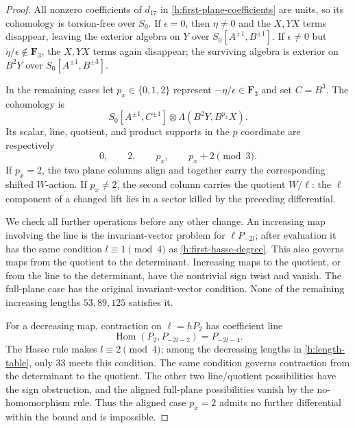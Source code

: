 \documentclass[11pt]{article}
\theoremstyle{definition}
\theoremstyle{remark}
\numberwithin{equation}{section}
\begin{document}
\begin{proof}
All nonzero coefficients of $d_{17}$ in
\eqref{h:first-plane-coefficients} are units, so its cohomology is
torsion-free over $S_0$. If $\epsilon=0$, then $\eta\ne0$ and the
$X,YX$ terms disappear, leaving the exterior algebra on $Y$ over
$S_0[A^{\pm1},B^{\pm1}]$. If $\epsilon\ne0$ but
$\eta/\epsilon\notin\mathbf F_3$, the $X,YX$ terms again disappear;
the surviving algebra is exterior on $B^2Y$ over
$S_0[A^{\pm1},B^{\pm3}]$.

In the remaining cases let $p_x\in\{0,1,2\}$ represent
$-\eta/\epsilon\in\mathbf F_3$ and set
$C=B^3$. The cohomology is
\begin{equation}
 \label{h:e18-algebra}
 S_0[A^{\pm1},C^{\pm1}]
   \otimes\Lambda(B^2Y,B^{p_x}X).
\end{equation}
Its scalar, line, quotient, and product supports in the $p$ coordinate
are respectively
\begin{equation}
 \label{h:e18-support}
 0,\qquad2,\qquad p_x,\qquad p_x+2\pmod3.
\end{equation}
If $p_x=2$, the two plane columns align and together carry the
corresponding shifted $W$-action. If $p_x\ne2$, the second column
carries the quotient $W/\ell$: the $\ell$ component of a changed
lift lies in a sector killed by the preceding differential.

We check all further operations before any other change. An increasing
map involving the line is the invariant-vector problem for
$\ell P_{-2l}$; after evaluation it has the same condition
$l\equiv1\pmod4$ as \eqref{h:first-hasse-degree}. This also governs
maps from the quotient to the determinant. Increasing maps to the
quotient, or from the line to the determinant, have the nontrivial
sign twist and vanish. The full-plane case has the original
invariant-vector condition. None of the remaining increasing lengths
$53,89,125$ satisfies it.

For a decreasing map, contraction on $\ell=hP_2$ has coefficient
line
\begin{equation}
 \label{h:line-contraction}
 \operatorname{Hom}(P_2,P_{-2l-2})=P_{-2l-4}.
\end{equation}
The Hasse rule makes $l\equiv2\pmod4$; among the decreasing lengths
in \eqref{h:length-table}, only $33$ meets this condition. The same
condition governs contraction from the determinant to the quotient.
The other two line/quotient possibilities have the sign obstruction,
and the aligned full-plane possibilities vanish by the no-homomorphism
rule. Thus the aligned case $p_x=2$ admits no further differential
within the bound and is impossible.


\end{proof}
\end{document}
